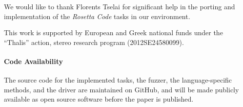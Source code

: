 \documentclass[10pt]{sigplanconf}
\begin{document}
\acks

We would like to thank Florents Tselai for significant
help in the porting and implementation of the
{\em Rosetta Code} tasks in our environment.

This work is supported by European and Greek national funds
under the ``Thalis'' action, {\sc stereo} research program
(2012SE24580099).

\paragraph{Code Availability} The source code for
the implemented tasks,
the fuzzer,
the language-specific methods, and
the driver are maintained on GitHub, and
will be made publicly available as open source software
before the paper is published.








\end{document}
